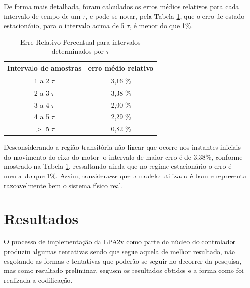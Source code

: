 

De forma mais detalhada, 
foram calculados os erros médios relativos para cada intervalo de 
tempo de um $\tau$, 
e pode-se notar, 
pela Tabela \ref{tab:ErroModeloTau}, 
que o erro de estado estacionário, para o intervalo acima de 5 $\tau$, é menor do que 1\%. 


\begin{table}[h]
\centering
\caption{Erro Relativo Percentual para intervalos determinados por $\tau$ }
\label{tab:ErroModeloTau}

\begin{tabular}{c|c}
\hline
Intervalo de amostras  &  erro médio relativo \\ \hline
\hline
1 a 2 $\tau$ &  3,16 \% \\ \hline
2 a 3 $\tau$ &  3,38 \% \\ \hline
3 a 4 $\tau$ &  2,00 \% \\ \hline
4 a 5 $\tau$ &  2,29 \% \\ \hline
$>$ 5 $\tau$ &  0,82 \% \\ \hline
\end{tabular}
\end{table}


Desconsiderando a região transitória não linear 
que ocorre nos instantes iniciais do movimento do eixo do motor, 
o intervalo de maior erro é de 3,38\%, 
conforme mostrado na Tabela \ref{tab:ErroModeloTau},
ressaltando ainda que no regime estacionário 
o erro é menor do que 1\%.
Assim, considera-se que o modelo utilizado é bom e representa razoavelmente bem o sistema físico real.





\section{Resultados}

O processo de implementação da LPA2v como parte do núcleo do controlador 
produziu algumas tentativas sendo que segue aquela de melhor resultado, 
não esgotando as formas e tentativas que poderão se seguir no decorrer da pesquisa, 
mas como resultado preliminar,
seguem os resultados obtidos e a forma como foi realizada a codificação.

